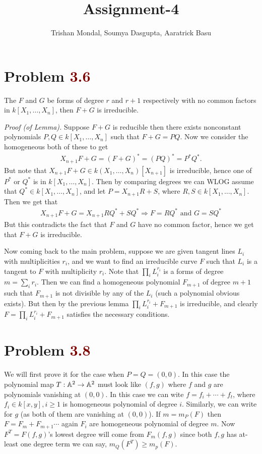 \documentclass[12pt]{article}
\title{\textbf{Assignment-4}}
\author{Trishan Mondal, Soumya Dasgupta, Aaratrick Basu}
\date{}
\begin{document}
\maketitle

\section{Problem \textcolor{maroon}{3.6}} 
\begin{Lem}{1} The $F$ and $G$ be forms of degree $r$ and $r+1$ respectively with no common factors in $k[X_1,\dots,X_n]$, then $F + G$ is irreducible.
\end{Lem}

\textit{Proof (of Lemma).} Suppose $F + G$ is reducible then there exists nonconstant polynomials $P,Q \in k[X_1,\dots,X_n]$ such that $F + G = PQ$. Now we consider the homogeneous both of these to get 
\begin{align*}
    X_{n+1} F + G = (F + G)^* = (PQ)^* = P^* Q^*.
\end{align*}
But note that $X_{n+1} F + G \in k(X_1,\dots,X_n)[X_{n+1}]$ is irreducible, hence one of $P^*$ or $Q^*$ is in $k[X_1,\dots,X_n]$. Then by comparing degrees we can WLOG assume that $Q^* \in k[X_1,\dots,X_n]$, and let $P = X_{n+1} R + S$, where $R , S \in k[X_1,\dots,X_n]$. Then we get that 
\begin{align*}
    X_{n+1} F + G = X_{n+1} R Q^* + S Q^* \Rightarrow F = R Q^* \mbox{ and } G = S Q^*
\end{align*}
But this contradicts the fact that $F$ and $G$ have no common factor, hence we get that $F + G$ is irreducible. 

Now coming back to the main problem, suppose we are given tangent lines $L_i$ with multiplicities $r_i$, and we want to find an irreducible curve $F$ such that $L_i$ is a tangent to $F$ with multiplicity $r_i$. Note that $\prod_i L_i^{r_i}$ is a forms of degree $m = \sum_i r_i$. Then we can find a homogeneous polynomial $F_{m+1}$ of degree $m+1$ such that $F_{m+1}$ is not divisible by any of the $L_i$ (such a polynomial obvious exists). But then by the previous lemma $\prod_i L_i^{r_i} + F_{m+1}$ is irreducible, and clearly $F = \prod_i L_i^{r_i} + F_{m+1}$ satisfies the necessary conditions. 

\section{Problem \textcolor{maroon}{3.8}} %

 We will first prove it for the case when $P = Q =(0,0)$. In this case the polynomial map $T : \mathbb{A}^2 \to \mathbb{A}^2$ must look like $(f,g)$ where $f$ and $g$ are polynomials vanishing at $(0,0)$. In this case we can wite $f = f_i + \cdots + f_t$, where $f_i  \in k[x,y],i \geq 1$ is homogeneous polynomial of degree $i$. Similarly, we can write for $g$ (as both of them are vanishing at $(0,0)$). If $m = m_P(F)$ then $F = F_m +F_{m+1}\cdots$ again $F_i$ are homogeneous polynomial of degree $m$. Now $F^T = F(f,g)$'s lowest degree will come from $F_m(f,g)$ since both $f,g$ has at-least one degree term we can say, $m_Q(F^T)\geq m_p(F)$.  
\end{document}
